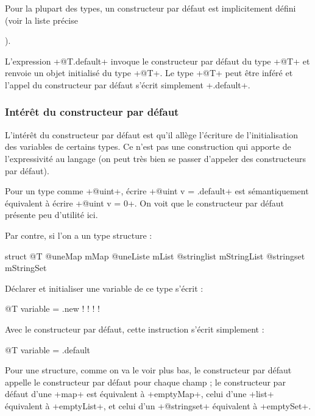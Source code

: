 
Pour la plupart des types, un constructeur par défaut est implicitement défini (voir la liste précise {).


L'expression \ggs+@T.default+ invoque le constructeur par défaut du type \ggs+@T+ et renvoie un objet initialisé du type \ggs+@T+. Le type \ggs+@T+ peut être inféré et l'appel du constructeur par défaut s'écrit simplement \ggs+.default+.

\subsubsection{Intérêt du constructeur par défaut}


L'intérêt du constructeur par défaut est qu'il allège l'écriture de l'initialisation des variables de certains types. Ce n'est pas une construction qui apporte de l'expressivité au langage (on peut très bien se passer d'appeler des constructeurs par défaut).

Pour un type comme \ggs+@uint+, écrire \ggs+@uint v = .default+ est sémantiquement équivalent à écrire \ggs+@uint v = 0+. On voit que le constructeur par défaut présente peu d'utilité ici.

Par contre, si l'on a un type structure :

\begin{galgas}
struct @T {
  @uneMap mMap
  @uneListe mList
  @stringlist mStringList
  @stringset mStringSet
}
\end{galgas}

Déclarer et initialiser une variable de ce type s'écrit :

\begin{galgas}
@T variable = .new {
  !{}
  !{}
  !{}
  !{}
}
\end{galgas}

Avec le constructeur par défaut, cette instruction s'écrit simplement :

\begin{galgas}
@T variable = .default
\end{galgas}

Pour une structure, comme on va le voir plus bas, le constructeur par défaut appelle le constructeur par défaut pour chaque champ ; le constructeur par défaut d'une \ggs+map+ est équivalent à \ggs+emptyMap+, celui d'une \ggs+list+ équivalent à \ggs+emptyList+, et celui d'un \ggs+@stringset+ équivalent à \ggs+emptySet+.


}
